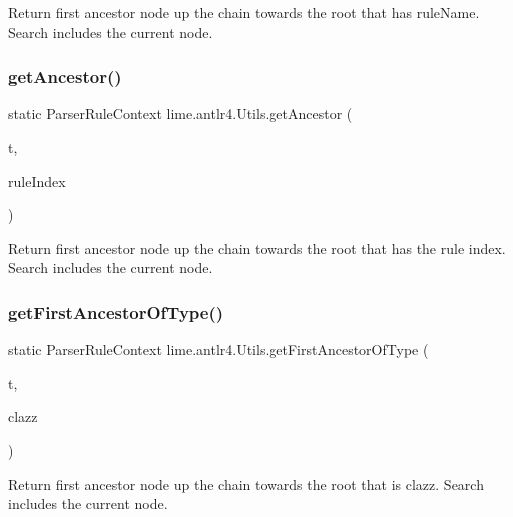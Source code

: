 Return first ancestor node up the chain towards the root that has rule\+Name. Search includes the current node. \mbox{\label{classlime_1_1antlr4_1_1Utils_a3caa3558f35e94dfb457f73e6f33f59e}} 
\subsubsection{\texorpdfstring{get\+Ancestor()}{getAncestor()}\hspace{0.1cm}{\footnotesize\ttfamily [2/2]}}
{\footnotesize\ttfamily static Parser\+Rule\+Context lime.\+antlr4.\+Utils.\+get\+Ancestor (\begin{DoxyParamCaption}\item[{Parser\+Rule\+Context}]{t,  }\item[{int}]{rule\+Index }\end{DoxyParamCaption})\hspace{0.3cm}{\ttfamily [static]}}

Return first ancestor node up the chain towards the root that has the rule index. Search includes the current node. \mbox{\label{classlime_1_1antlr4_1_1Utils_adbc7653fb02c8f435de3c6bce42289d2}} 
\subsubsection{\texorpdfstring{get\+First\+Ancestor\+Of\+Type()}{getFirstAncestorOfType()}}
{\footnotesize\ttfamily static Parser\+Rule\+Context lime.\+antlr4.\+Utils.\+get\+First\+Ancestor\+Of\+Type (\begin{DoxyParamCaption}\item[{Parser\+Rule\+Context}]{t,  }\item[{Class$<$?$>$}]{clazz }\end{DoxyParamCaption})\hspace{0.3cm}{\ttfamily [static]}}

Return first ancestor node up the chain towards the root that is clazz. Search includes the current node. \mbox{\label{classlime_1_1antlr4_1_1Utils_a753bab7a7ce1e75351fef66487869748}} 
